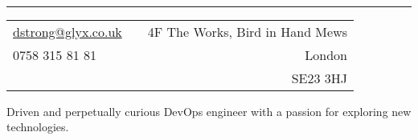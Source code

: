 \documentclass[a4paper,10pt]{article} %
\begin{document}
\pagestyle{empty} %


\\ %
\hrule
\footnotesize{
\begin{tabularx}{\textwidth}{lXr}
\href{mailto:dstrong@glyx.co.uk}{dstrong@glyx.co.uk} & & {4F The Works, Bird in Hand Mews}\\
{0758 315 81 81}                                     & & {London}\\
                                                     & & {SE23 3HJ}
\end{tabularx}
}

\begin{flushleft}
Driven and perpetually curious DevOps engineer with a passion for exploring new technologies.
\end{flushleft}

\end{document}
